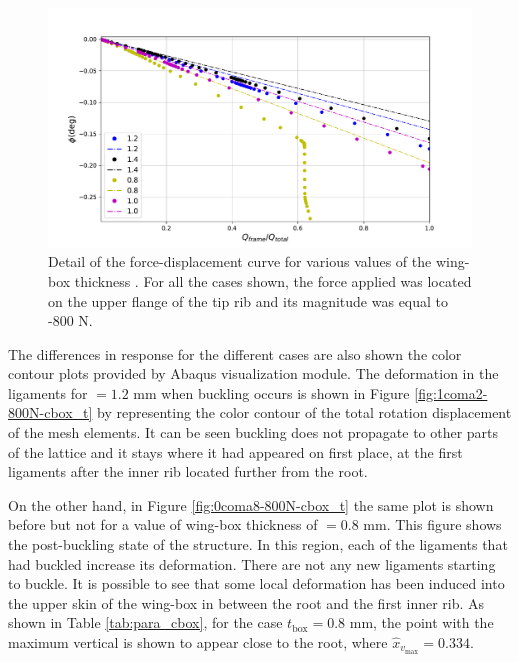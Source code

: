     \begin{figure}[!htpb] %
      \centering
      \includegraphics[width=0.8 \textwidth]{../figures/result-sim/cbox/force_displacement-close}
      \caption[Detail of the force-displacement curve for various values of the wing-box thickness]{Detail of the force-displacement curve for various values of the wing-box thickness \boxt. For all the cases shown, the force applied was located on the upper flange of the tip rib and its magnitude was equal to -800 N.}\label{fig:forceDisplacement-close-Cbox_t}
    \end{figure}

    The differences in response for the different cases are also shown the color contour plots provided by Abaqus visualization module. The deformation in the ligaments for \boxt$= 1.2$ mm when buckling occurs is shown in Figure \ref{fig:1coma2-800N-cbox_t} by representing the color contour of the total rotation displacement of the mesh elements. It can be seen buckling does not propagate to other parts of the lattice and it stays where it had appeared on first place, at the first ligaments after the inner rib located further from the root. 

    On the other hand, in Figure \ref{fig:0coma8-800N-cbox_t} the same plot is shown before but not for a value of wing-box thickness of \boxt$= 0.8$ mm. This figure shows the post-buckling state of the structure. In this region, each of the ligaments that had buckled increase its deformation. There are not any new ligaments starting to buckle. It is possible to see that some local deformation has been induced into the upper skin of the wing-box in between the root and the first inner rib. As shown in Table \ref{tab:para_cbox}, for the case $t_{\mathrm{box}} = 0.8$ mm, the point with the maximum vertical is shown to appear close to the root, where $\hat{x}_{v_{\mathrm{max}}} = 0.334$.

